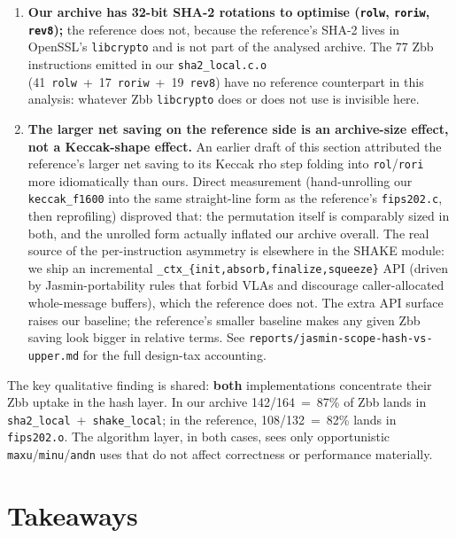 \documentclass[11pt,a4paper]{article}
\begin{document}
\begin{enumerate}[nosep]
  \item \textbf{Our archive has 32-bit SHA-2 rotations to optimise
    (\texttt{rolw}, \texttt{roriw}, \texttt{rev8});} the reference
    does not, because the reference's SHA-2 lives in OpenSSL's
    \texttt{libcrypto} and is not part of the analysed archive.  The
    77 Zbb instructions emitted in our \texttt{sha2\_local.c.o}
    (41~\texttt{rolw}~+~17~\texttt{roriw}~+~19~\texttt{rev8}) have no
    reference counterpart in this analysis: whatever Zbb
    \texttt{libcrypto} does or does not use is invisible here.
  \item \textbf{The larger net saving on the reference side is an
    archive-size effect, not a Keccak-shape effect.}  An earlier draft
    of this section attributed the reference's larger net saving to
    its Keccak rho step folding into \texttt{rol}/\texttt{rori} more
    idiomatically than ours.  Direct measurement (hand-unrolling our
    \texttt{keccak\_f1600} into the same straight-line form as the
    reference's \texttt{fips202.c}, then reprofiling) disproved that:
    the permutation itself is comparably sized in both, and the
    unrolled form actually inflated our archive overall.  The real
    source of the per-instruction asymmetry is elsewhere in the SHAKE
    module: we ship an incremental \texttt{\_ctx\_\{init,absorb,finalize,squeeze\}}
    API (driven by Jasmin-portability rules that forbid VLAs and
    discourage caller-allocated whole-message buffers), which the
    reference does not.  The extra API surface raises our baseline;
    the reference's smaller baseline makes any given Zbb saving look
    bigger in relative terms.  See \texttt{reports/jasmin-scope-hash-vs-upper.md}
    for the full design-tax accounting.
\end{enumerate}

The key qualitative finding is shared: \textbf{both} implementations
concentrate their Zbb uptake in the hash layer.  In our archive
142/164~=~87\% of Zbb lands in \texttt{sha2\_local}~+~\texttt{shake\_local};
in the reference, 108/132~=~82\% lands in \texttt{fips202.o}.  The
algorithm layer, in both cases, sees only opportunistic
\texttt{maxu}/\texttt{minu}/\texttt{andn} uses that do not affect
correctness or performance materially.

\section{Takeaways}
\end{document}
